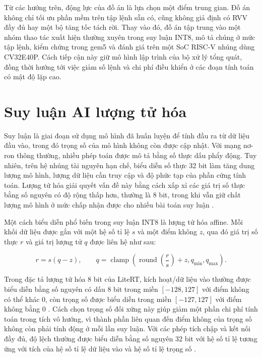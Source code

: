 \documentclass[../DoAn.tex]{subfiles}
\begin{document}
Từ các hướng trên, động lực của đồ án là lựa chọn một điểm trung gian. Đồ án không chỉ tối ưu phần mềm trên tập lệnh sẵn có, cũng không giả định có RVV đầy đủ hay một bộ tăng tốc tách rời. Thay vào đó, đồ án tập trung vào một nhóm thao tác xuất hiện thường xuyên trong suy luận INT8, mô tả chúng ở mức tập lệnh, kiểm chứng trong gem5 và đánh giá trên một SoC RISC-V nhúng dùng CV32E40P. Cách tiếp cận này giữ mô hình lập trình của bộ xử lý tổng quát, đồng thời hướng tới việc giảm số lệnh và chi phí điều khiển ở các đoạn tính toán có mật độ lặp cao.


\section{Suy luận AI lượng tử hóa}
\label{sec:suy-luan-ai-luong-tu-hoa}

Suy luận là giai đoạn sử dụng mô hình đã huấn luyện để tính đầu ra từ dữ liệu đầu vào, trong đó trọng số của mô hình không còn được cập nhật. Với mạng nơ-ron thông thường, nhiều phép toán được mô tả bằng số thực dấu phẩy động. Tuy nhiên, trên hệ nhúng tài nguyên hạn chế, biểu diễn số thực 32 bit làm tăng dung lượng mô hình, lượng dữ liệu cần truy cập và độ phức tạp của phần cứng tính toán. Lượng tử hóa giải quyết vấn đề này bằng cách xấp xỉ các giá trị số thực bằng số nguyên có độ rộng thấp hơn, thường là 8 bit, trong khi vẫn giữ chất lượng mô hình ở mức chấp nhận được cho nhiều bài toán suy luận \cite{jacob2018integer}.

Một cách biểu diễn phổ biến trong suy luận INT8 là lượng tử hóa affine. Mỗi khối dữ liệu được gắn với một hệ số tỉ lệ \(s\) và một điểm không \(z\), qua đó giá trị số thực \(r\) và giá trị lượng tử \(q\) được liên hệ như sau:

\begin{equation}
    r = s(q - z), \qquad
    q = \operatorname{clamp}\left(\operatorname{round}\left(\frac{r}{s}\right) + z, q_{\min}, q_{\max}\right).
    \label{eq:affine-quantization}
\end{equation}

Trong đặc tả lượng tử hóa 8 bit của LiteRT, kích hoạt/dữ liệu vào thường được biểu diễn bằng số nguyên có dấu 8 bit trong miền \([-128,127]\) với điểm không có thể khác 0, còn trọng số được biểu diễn trong miền \([-127,127]\) với điểm không bằng 0 \cite{google_litert_quant_spec}. Cách chọn trọng số đối xứng này giúp giảm một phần chi phí tính toán trong tích vô hướng, vì thành phần liên quan đến điểm không của trọng số không còn phải tính động ở mỗi lần suy luận. Với các phép tích chập và kết nối đầy đủ, độ lệch thường được biểu diễn bằng số nguyên 32 bit với hệ số tỉ lệ tương ứng với tích của hệ số tỉ lệ dữ liệu vào và hệ số tỉ lệ trọng số \cite{google_litert_quant_spec}.
\end{document}
